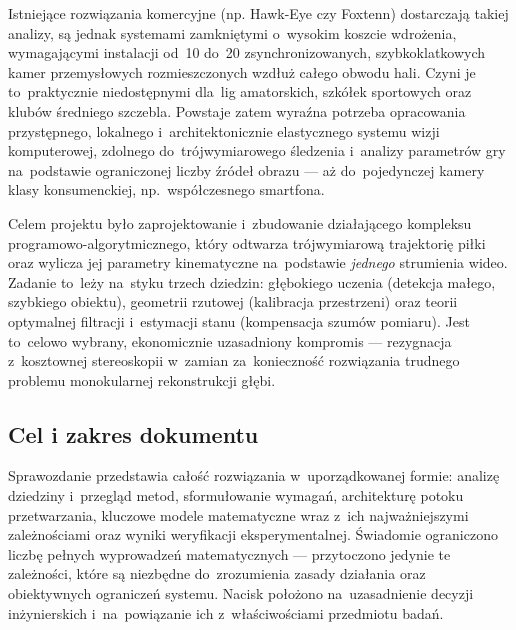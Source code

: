 \documentclass[14pt,a4paper]{extarticle}
\begin{document}
Istniejące rozwiązania komercyjne (np. Hawk-Eye czy Foxtenn) dostarczają takiej analizy,
są jednak systemami zamkniętymi o~wysokim koszcie wdrożenia, wymagającymi instalacji
od~10 do~20 zsynchronizowanych, szybkoklatkowych kamer przemysłowych rozmieszczonych
wzdłuż całego obwodu hali. Czyni je to~praktycznie niedostępnymi dla~lig amatorskich,
szkółek sportowych oraz klubów średniego szczebla. Powstaje zatem wyraźna potrzeba
opracowania przystępnego, lokalnego i~architektonicznie elastycznego systemu wizji
komputerowej, zdolnego do~trójwymiarowego śledzenia i~analizy parametrów gry na~podstawie
ograniczonej liczby źródeł obrazu — aż do~pojedynczej kamery klasy konsumenckiej,
np.~współczesnego smartfona.

Celem projektu było zaprojektowanie i~zbudowanie działającego kompleksu
programowo-algorytmicznego, który odtwarza trójwymiarową trajektorię piłki oraz wylicza
jej parametry kinematyczne na~podstawie \emph{jednego} strumienia wideo. Zadanie to~leży
na~styku trzech dziedzin: głębokiego uczenia (detekcja małego, szybkiego obiektu),
geometrii rzutowej (kalibracja przestrzeni) oraz teorii optymalnej filtracji i~estymacji
stanu (kompensacja szumów pomiaru). Jest to~celowo wybrany, ekonomicznie uzasadniony
kompromis — rezygnacja z~kosztownej stereoskopii w~zamian za~konieczność rozwiązania
trudnego problemu monokularnej rekonstrukcji głębi.

\subsection{Cel i zakres dokumentu}
Sprawozdanie przedstawia całość rozwiązania w~uporządkowanej formie: analizę dziedziny
i~przegląd metod, sformułowanie wymagań, architekturę potoku przetwarzania, kluczowe
modele matematyczne wraz z~ich najważniejszymi zależnościami oraz wyniki weryfikacji
eksperymentalnej. Świadomie ograniczono liczbę pełnych wyprowadzeń matematycznych —
przytoczono jedynie te zależności, które są niezbędne do~zrozumienia zasady działania
oraz obiektywnych ograniczeń systemu. Nacisk położono na~uzasadnienie decyzji
inżynierskich i~na~powiązanie ich z~właściwościami przedmiotu badań.
\end{document}
